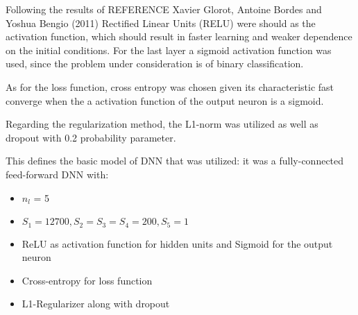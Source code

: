 \documentclass{article}
\begin{document}
Following the results of REFERENCE  Xavier Glorot, Antoine Bordes and Yoshua Bengio (2011) Rectified Linear Units (RELU) were should as the activation function, which should result in faster learning and weaker dependence on the initial conditions. For the last layer a sigmoid activation function was used, since the problem under consideration is of binary classification.

As for the loss function, cross entropy was chosen given its characteristic fast converge when the a activation function of the output neuron is a sigmoid.

Regarding the regularization method, the L1-norm was utilized as well as dropout with 0.2 probability parameter.

This defines the basic model of DNN that was utilized: it was a fully-connected feed-forward DNN with:
\begin{itemize}
\item $n_l$ = 5
\item $S_1 = 12700, S_2=S_3=S_4 = 200, S_5=1$
\item ReLU as activation function for hidden units and Sigmoid for the output neuron
\item Cross-entropy for loss function
\item L1-Regularizer along with dropout
\end{itemize}
\end{document}
